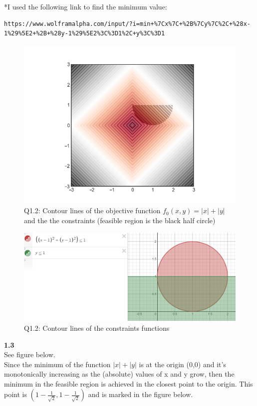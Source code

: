 \documentclass[fleqn]{article}
\begin{document}
*I used the following link to find the minimum value: \\
\begin{lstlisting}[breaklines]
https://www.wolframalpha.com/input/?i=min+%7Cx%7C+%2B%7Cy%7C%2C+%28x-1%29%5E2+%2B+%28y-1%29%5E2%3C%3D1%2C+y%3C%3D1
\end{lstlisting} 

\begin{figure}[h!]
\includegraphics[width=0.8\linewidth]{q1_2.PNG}
\caption{Q1.2: Contour lines of the objective function $f_0(x,y) = \lvert x\rvert +\lvert y \rvert$ and the the constraints (feasible region is the black half circle)}
\end{figure}


\begin{figure}[h!]
\includegraphics[width=0.8\linewidth]{q1_2_constraints_contours.PNG}
\caption{Q1.2: Contour lines of the constraints functions}
\end{figure}

\textbf{1.3} \\
See figure below. \\

Since the minimum of the function  $\lvert x\rvert +\lvert y \rvert $ is at the origin (0,0) and it's monotonically increasing as the (absolute) values of x and y grow, then the minimum in the feasible region is achieved in the closest point to the origin. This point is $(1-\frac{1}{\sqrt{2}}, 1-\frac{1}{\sqrt{2}})$ and is marked in the figure below.\\
\end{document}
